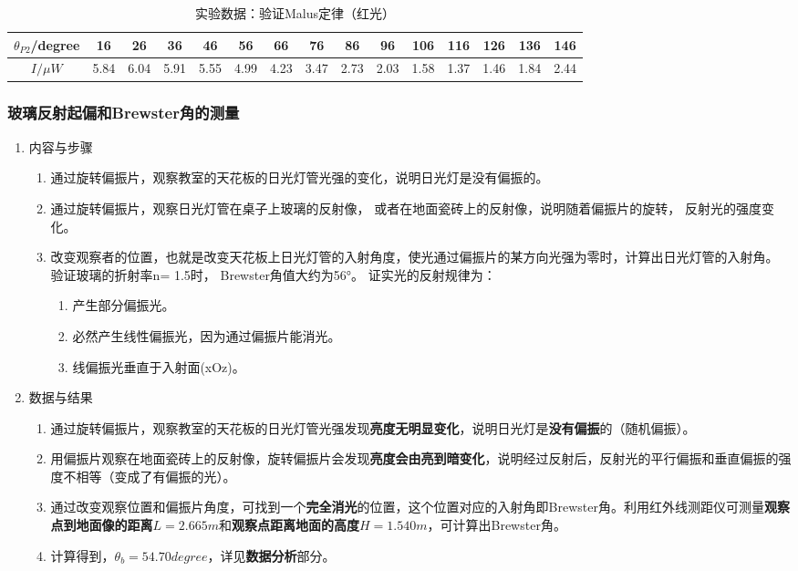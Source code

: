\documentclass[dvipsnames, svgnames,a4paper,11pt]{article}
\begin{document}
\begin{enumerate}
		\begin{table}[h]
			\centering
			\caption{实验数据：验证Malus定律（红光）}
			\label{tab:tab3}
			\begin{tabular}{|c|c|c|c|c|c|c|c|c|c|c|c|c|c|c|}
				\hline
				$\theta_{P2}$/degree & 16 & 26 & 36 & 46 & 56 & 66 & 76 & 86 & 96 & 106 & 116 & 126 & 136 & 146 \\
				\hline
				$I/\mu W$ & 5.84 & 6.04 & 5.91 & 5.55 & 4.99 & 4.23 & 3.47 & 2.73 & 2.03 & 1.58 & 1.37 & 1.46 & 1.84 & 2.44 \\
				\hline
			\end{tabular}
		\end{table}
		
	\end{enumerate}	
	
	\subsubsection{玻璃反射起偏和Brewster角的测量}
	\begin{enumerate}
		\item 内容与步骤
		
		\begin{enumerate}
			\item 通过旋转偏振片，观察教室的天花板的日光灯管光强的变化，说明日光灯是没有偏振的。
			\item 通过旋转偏振片，观察日光灯管在桌子上玻璃的反射像， 或者在地面瓷砖上的反射像，说明随着偏振片的旋转， 反射光的强度变化。
			\item 改变观察者的位置，也就是改变天花板上日光灯管的入射角度，使光通过偏振片的某方向光强为零时，计算出日光灯管的入射角。 验证玻璃的折射率n= 1.5时， Brewster角值大约为56°。
			证实光的反射规律为：
			\begin{enumerate}
				\item 产生部分偏振光。
				\item 必然产生线性偏振光，因为通过偏振片能消光。
				\item 线偏振光垂直于入射面(xOz)。
			\end{enumerate}
		\end{enumerate}
		
		\item 数据与结果
		
		\begin{enumerate}
			\item 通过旋转偏振片，观察教室的天花板的日光灯管光强发现\textbf{亮度无明显变化}，说明日光灯是\textbf{没有偏振}的（随机偏振）。
			\item 用偏振片观察在地面瓷砖上的反射像，旋转偏振片会发现\textbf{亮度会由亮到暗变化}，说明经过反射后，反射光的平行偏振和垂直偏振的强度不相等（变成了有偏振的光）。
			\item 通过改变观察位置和偏振片角度，可找到一个\textbf{完全消光}的位置，这个位置对应的入射角即Brewster角。利用红外线测距仪可测量\textbf{观察点到地面像的距离$L=2.665m$}和\textbf{观察点距离地面的高度$H=1.540m$}，可计算出Brewster角。
			\item 计算得到，$\theta_b=54.70degree$，详见\textbf{数据分析}部分。
		\end{enumerate}
		
	\end{enumerate}	
	
\end{document}
